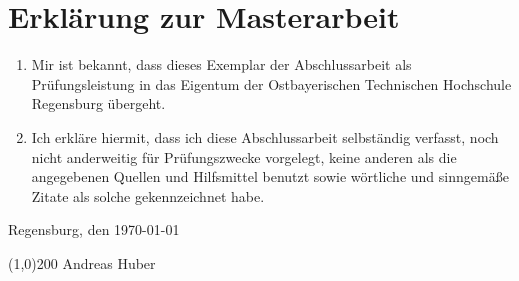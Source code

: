 \thispagestyle{empty}
\section*{Erklärung zur Masterarbeit}

\bigskip
\bigskip 
\bigskip 

\begin{enumerate}
    \item Mir ist bekannt, dass dieses Exemplar der Abschlussarbeit als Prüfungsleistung in das Eigentum der Ostbayerischen Technischen Hochschule Regensburg übergeht.
    \item Ich erkläre hiermit, dass ich diese Abschlussarbeit selbständig verfasst, noch nicht anderweitig für Prüfungszwecke vorgelegt, keine anderen als die angegebenen Quellen und Hilfsmittel benutzt sowie wörtliche und sinngemäße Zitate als solche gekennzeichnet habe.
\end{enumerate}

\bigskip 
\bigskip 
\bigskip 

\noindent Regensburg, den \today

\bigskip 
\bigskip

\noindent\line(1,0){200}
\newline
\noindent Andreas Huber